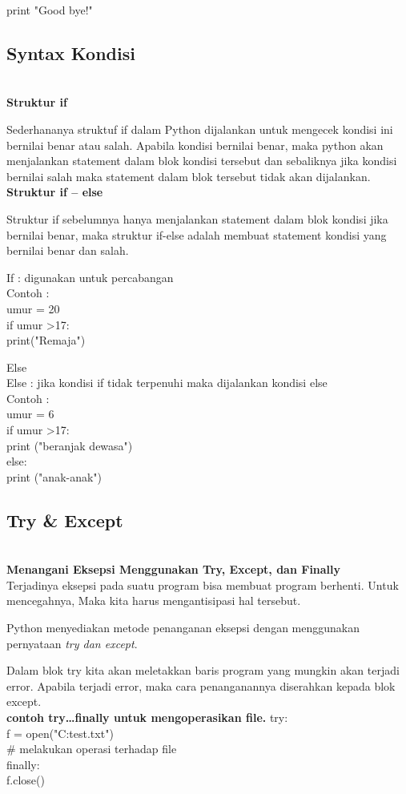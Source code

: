 \documentclass{article}
\begin{document}
print "Good bye!"

    \subsection {Syntax Kondisi}\\
    \textbf{Struktur if}
    \item Sederhananya struktuf if dalam Python dijalankan untuk mengecek kondisi ini bernilai benar atau salah. Apabila kondisi  bernilai benar, maka python akan menjalankan statement dalam blok kondisi tersebut dan sebaliknya jika kondisi bernilai salah maka statement dalam blok tersebut tidak akan dijalankan.\\
    
    \textbf{Struktur if – else}
    \item Struktur if sebelumnya hanya menjalankan statement dalam blok kondisi jika bernilai benar, maka struktur if-else adalah membuat statement kondisi yang bernilai benar dan salah.


\item If : digunakan untuk percabangan\\
Contoh :\\
umur = 20\\
if umur \textgreater 17:\\
    print("Remaja")\\
\item Else\\
Else : jika kondisi if tidak terpenuhi maka dijalankan kondisi else\\
Contoh :\\
umur = 6\\
if umur \textgreater 17:\\
    print ("beranjak dewasa")\\
else:\\
    print ("anak-anak")\\

\subsection{Try & Except}\\
\textbf{Menangani Eksepsi Menggunakan Try, Except, dan Finally}\\

Terjadinya eksepsi pada suatu program bisa membuat program berhenti. Untuk mencegahnya, Maka kita harus mengantisipasi hal tersebut.

Python menyediakan metode penanganan eksepsi dengan menggunakan pernyataan \textit{try dan except}.

Dalam blok try kita akan meletakkan baris program yang mungkin akan terjadi error. Apabila terjadi error, maka cara penanganannya diserahkan kepada blok except. \\

\textbf{contoh try…finally untuk mengoperasikan file.} 
try:\\
    f = open("C:test.txt")\\
    # melakukan operasi terhadap file\\
finally:\\
    f.close()\\
\end{document}
